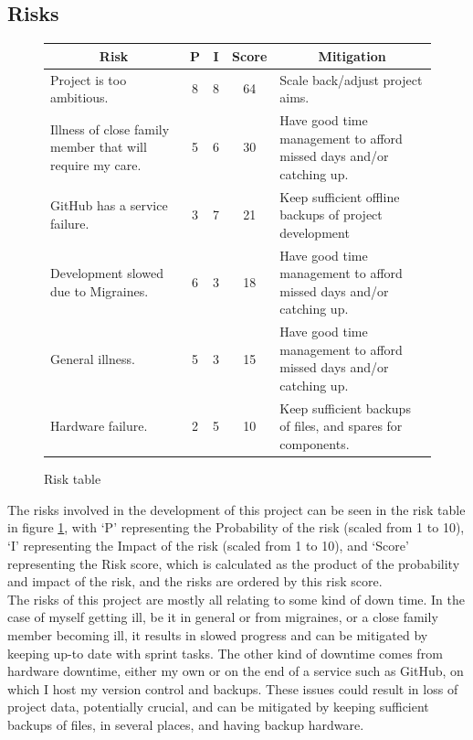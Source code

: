 \documentclass[10pt]{article}
\begin{document}
	\bigskip
		
	\subsection{Risks}
	\begin{figure}[h]
		\begin{tabular}{ p{4.5cm} | c | c | c | p{4.5cm} }
			\multicolumn{1}{c}{\textbf{Risk}} & \textbf{P} & \textbf{I} & \textbf{Score} & \multicolumn{1}{c}{\textbf{Mitigation}}\\ \hline
			Project is too ambitious. & 8 & 8 & 64 & Scale back/adjust project aims.\\ \hline
						
			Illness of close family member that will require my care. & 5 & 6 & 30 & Have good time management to afford missed days and/or catching up.\\ \hline
			GitHub has a service failure. & 3 & 7 & 21 & Keep sufficient offline backups of project development\\ \hline			 
			Development slowed due to Migraines. & 6 & 3 & 18 & Have good time management to afford missed days and/or catching up.\\ \hline 
			General illness. & 5 & 3 & 15 & Have good time management to afford missed days and/or catching up.\\ \hline
			Hardware failure. & 2 & 5 & 10 & Keep sufficient backups of files, and spares for components.					 
		\end{tabular}		
		\caption{Risk table}
		\label{fig:newRisks}
	\end{figure}
	
	The risks involved in the development of this project can be seen in the risk table in figure \ref{fig:newRisks}, with `P' representing the Probability of the risk (scaled from 1 to 10), `I' representing the Impact of the risk (scaled from 1 to 10), and `Score' representing the Risk score, which is calculated as the product of the probability and impact of the risk, and the risks are ordered by this risk score.\\
	
	The risks of this project are mostly all relating to some kind of down time. In the case of myself getting ill, be it in general or from migraines, or a close family member becoming ill, it results in slowed progress and can be mitigated by keeping up-to date with sprint tasks. The other kind of downtime comes from hardware downtime, either my own or on the end of a service such as GitHub, on which I host my version control and backups. These issues could result in loss of project data, potentially crucial, and can be mitigated by keeping sufficient backups of files, in several places, and having backup hardware.\\		
	
\end{document}
